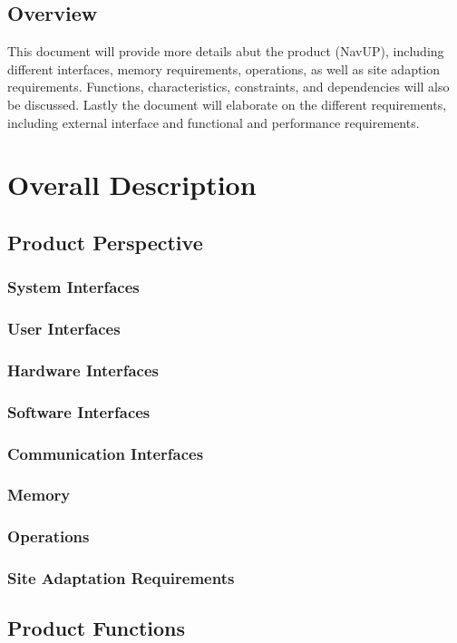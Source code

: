 \documentclass[12pt, a4paper]{article}
\begin{document}
\subsection{Overview}
This document will provide more details abut the product (NavUP), including different interfaces, memory requirements, operations, as well as site adaption requirements. Functions, characteristics, constraints, and dependencies will also be discussed. Lastly the document will elaborate on  the different requirements, including external interface and functional and performance requirements.

\section{Overall Description}
	\subsection{Product Perspective}
		\subsubsection{System Interfaces}
		\subsubsection{User Interfaces}
		\subsubsection{Hardware Interfaces}
		\subsubsection{Software Interfaces}
		\subsubsection{Communication Interfaces}
		\subsubsection{Memory}
		\subsubsection{Operations}
		\subsubsection{Site Adaptation Requirements}
	\subsection{Product Functions}
\end{document}
